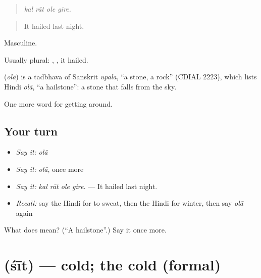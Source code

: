 \begin{quote}
   
\end{quote}

\begin{quote}
\emph{kal rāt ole gire.}
\end{quote}

\begin{quote}
It hailed last night.
\end{quote}

Masculine.

Usually plural:  ,  , it hailed.

\begin{cousinweb}
\textbf{} (\emph{olā}) is a tadbhava of Sanskrit \emph{upala}, \textquotedblleft{}a stone, a rock\textquotedblright{} (CDIAL 2223), which lists Hindi \emph{olā}, \textquotedblleft{}a hailstone\textquotedblright{}: a stone that falls from the sky.
\end{cousinweb}

\begin{grammarlens}[title={What you've built}]
One more word for getting around.
\end{grammarlens}

\subsection*{Your turn}
\begin{itemize}
\raggedright
  \item \emph{Say it:} \emph{olā}
  \item \emph{Say it:} \emph{olā}, once more
  \item \emph{Say it:} \emph{kal rāt ole gire.} — It hailed last night.
  \item \emph{Recall:} say the Hindi for to sweat, then the Hindi for winter, then say \emph{olā} again
\end{itemize}

\begin{tcolorbox}[breakable,colback=teal!4,colframe=teal!35!black,title={Before you move on}]
What does  mean? (\textquotedblleft{}A hailstone\textquotedblright{}.) Say it once more.
\end{tcolorbox}
\section[\texorpdfstring{\hi{शीत} (śīt)}{शीत (śīt)}]{ (śīt) — cold; the cold (formal)}


